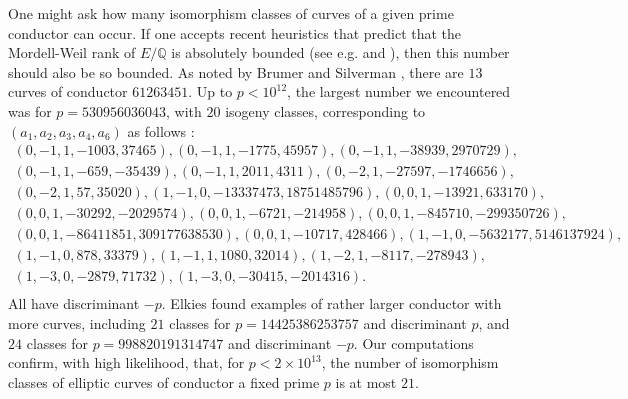 One might ask how many isomorphism classes of curves of a given prime conductor can occur. If one accepts recent 
heuristics that predict that the Mordell-Weil rank of $E/\mathbb{Q}$ is absolutely bounded (see e.g. \cite{PPVW} and \cite{Watetal}), then this number should also be so bounded. As noted by Brumer and Silverman \cite{BrSi}, 
there are $13$ curves of conductor $61263451$. Up to $p < 10^{12}$, the largest number we encountered was for $ p=530956036043$,
with $20$ isogeny classes, corresponding to $(a_1,a_2,a_3,a_4,a_6)$ as follows :
 $$
 \begin{array}{l}
 \left( 0, -1, 1, -1003, 37465 \right), \left( 0, -1, 1, -1775, 45957 \right), \left( 0, -1, 1, -38939, 2970729 \right),  \\
 \left( 0, -1, 1, -659, -35439 \right), \left(0, -1, 1, 2011, 4311\right), \left(0, -2, 1, -27597, -1746656\right), \\
\left( 0, -2, 1, 57, 35020\right),  \left(1, -1, 0, -13337473,18751485796\right),\left(0, 0, 1, -13921, 633170\right), \\
\left( 0, 0, 1, -30292,-2029574\right),\left(0, 0, 1, -6721, -214958\right), \left(0, 0, 1, -845710, -299350726\right), \\
\left( 0, 0, 1, -86411851, 309177638530\right),  \left(0,0, 1, -10717, 428466\right), \left(1, -1, 0, -5632177, 5146137924\right), \\
 \left( 1, -1, 0, 878,33379\right),  \left(1, -1, 1, 1080, 32014\right), \left(1, -2, 1, -8117, -278943\right), \\
\left(1, -3, 0, -2879, 71732\right), \left(1, -3, 0, -30415, -2014316\right). \\
\end{array}
$$
  All have discriminant $-p$.
 Elkies \cite{Elk1} found examples of rather larger conductor with more curves, including
 $21$ classes for $p=14425386253757$ and discriminant $p$, and $24$ classes for $p=998820191314747$ and discriminant $-p$. Our computations confirm, with high likelihood, that, for $p < 2 \times 10^{13}$, the number of isomorphism classes of elliptic curves of conductor a fixed prime $p$ is at most $21$.
 
